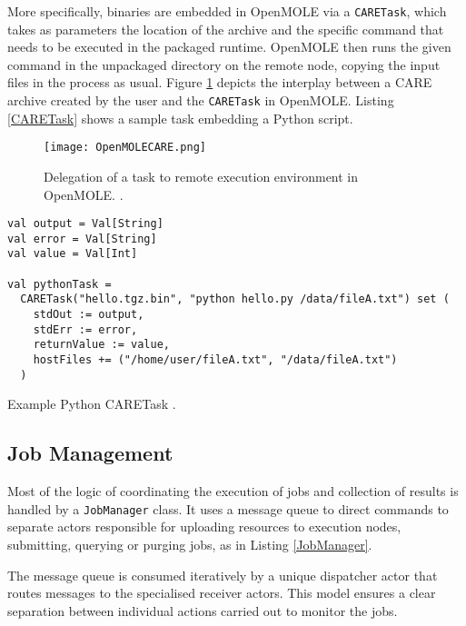More specifically, binaries are embedded in OpenMOLE via a \verb|CARETask|, which takes as parameters the location of the archive and the specific command that needs to be executed in the packaged runtime. OpenMOLE then runs the given command in the unpackaged directory on the remote node, copying the input files in the process as usual. Figure \ref{OpenMOLECARE} depicts the interplay between a CARE archive created by the user and the \verb|CARETask| in OpenMOLE. Listing \ref{CARETask} shows a sample task embedding a Python script.

\begin{figure}[h]
	\centering
		\texttt{[image: OpenMOLECARE.png]}
	\caption{Delegation of a task to remote execution environment in OpenMOLE. \cite{Leclaire2016}.}
	\label{OpenMOLECARE}
\end{figure}

\begin{listing}[h]
	\centering
	\begin{minipage}{13cm}
		\begin{verbatim}
val output = Val[String]
val error = Val[String]
val value = Val[Int]

val pythonTask = 
  CARETask("hello.tgz.bin", "python hello.py /data/fileA.txt") set ( 
    stdOut := output,
    stdErr := error, 
    returnValue := value, 
    hostFiles += ("/home/user/fileA.txt", "/data/fileA.txt") 
  )
		\end{verbatim}
	\end{minipage}
	\caption{Example Python CARETask \cite{Leclaire2016}.}
	\label{CARETask}
\end{listing}

\subsection{Job Management}

Most of the logic of coordinating the execution of jobs and collection of results is handled by a \verb|JobManager| class. It uses a message queue to direct commands to separate actors responsible for uploading resources to execution nodes, submitting, querying or purging jobs, as in Listing \ref{JobManager}. 

The message queue is consumed iteratively by a unique dispatcher actor that routes messages to the specialised receiver actors. This model ensures a clear separation between individual actions carried out to monitor the jobs.

